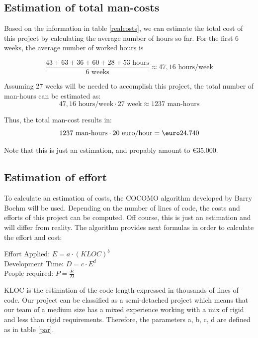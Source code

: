 \documentclass[a4paper, 12pt]{report}
\begin{document}
			\subsection{Estimation of total man-costs}
			
			Based on the information in table \ref{realcosts}, we can estimate the total cost of this project
			by calculating the average number of hours so far. For the first 6 weeks, the average number of worked hours is
			
			\[ \frac{43 + 63 + 36 + 60 + 28 + 53 \textrm{ hours}}{6 \textrm{ weeks}} \approx 47,16 \textrm{ hours/week} \]
			
			Assuming 27 weeks will be needed to accomplish this project, the total number of man-hours can be estimated as:
			\[ 47,16 \textrm{ hours/week} \cdot  27 \textrm{ week} \approx 1237 \textrm{ man-hours} \]
			
			Thus, the total man-cost results in:
			\[ 1237 \textrm{ man-hours} \cdot  20 \textrm{ euro/hour} = \textrm{\euro} 24.740 \]

			Note that this is just an estimation, and propably amount to \euro 35.000. 
			
			
			
			\subsection{Estimation of effort}
			
			To calculate an estimation of costs, the COCOMO algorithm developed by Barry Boehm
			will be used. Depending on the number of lines of code, the costs and efforts of this
			project can be computed. Off course, this is just an estimation and will differ from
			reality. The algorithm provides next formulas in order to calculate the effort and
			cost:
			
			\begin{center}
			Effort Applied: $ E = a \cdot (KLOC)^{b} $ \\
			Development Time: $ D = c \cdot E^{d} $ \\
			People required: $ P = \frac{E}{D} $ \\
			\end{center}
			
			KLOC is the estimation of the code length expressed in thousands of lines of code.
			Our project can be classified as a semi-detached project which means that our team of
			a medium size has a mixed experience working with a mix of rigid and less than rigid
			requirements. Therefore, the parameters a, b, c, d are defined as in table \ref{par}. 		
			
\end{document}
